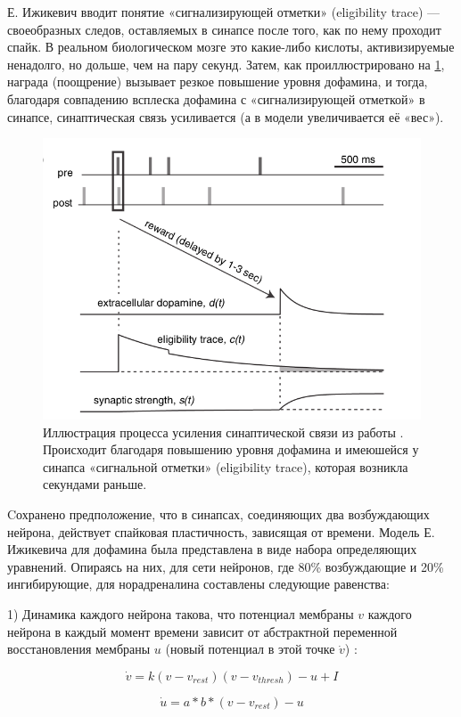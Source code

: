 Е. Ижикевич вводит понятие «сигнализирующей отметки» (eligibility trace) — своеобразных следов, оставляемых в синапсе после того, как по нему проходит спайк. В реальном биологическом мозге это какие-либо кислоты, активизируемые ненадолго, но дольше, чем на пару секунд. Затем, как проиллюстрировано на \ref{fig:izhikevich}, награда (поощрение) вызывает резкое повышение уровня дофамина, и тогда, благодаря совпадению всплеска дофамина с «сигнализирующей отметкой» в синапсе, синаптическая связь усиливается (а в модели увеличивается её «вес»).


\begin{figure}
	\centering
	\includegraphics[width=0.5\linewidth]{figures/izhikevich}
	\caption{Иллюстрация процесса усиления синаптической связи из работы \cite{izhikevich}. Происходит благодаря повышению уровня дофамина и имеюшейся у синапса «сигнальной отметки» (eligibility trace), которая возникла секундами раньше.}
	\label{fig:izhikevich}
\end{figure}


Cохранено предположение, что в синапсах, соединяющих два возбуждающих нейрона, действует спайковая пластичность, зависящая от времени. Модель Е. Ижикевича для дофамина была представлена в виде набора определяющих уравнений. Опираясь на них, для сети нейронов, где 80\% возбуждающие и 20\% ингибирующие, для норадреналина составлены следующие равенства:


1) Динамика каждого нейрона такова, что потенциал мембраны $v$ каждого нейрона в каждый момент времени зависит от абстрактной переменной восстановления мембраны $u$ (новый потенциал в этой точке $\dot{v}$) \cite{tactile}:

\begin{equation} \label{eq:1}
\dot{v} = k (v - v_{rest})(v - v_{thresh}) - u + I
\end{equation}


\begin{equation} \label{eq:2}
\dot{u}=  a*b*(v - v_{rest}) - u
\end{equation}


